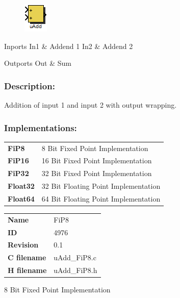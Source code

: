 \label{block:uAdd}
\begin{figure}[H]\includegraphics{uAdd}\end{figure} 

\begin{XtoCtabular}{Inports}
In1 & Addend 1\tabularnewline
\hline
In2 & Addend 2\tabularnewline
\hline
\end{XtoCtabular}


\begin{XtoCtabular}{Outports}
Out & Sum\tabularnewline
\hline
\end{XtoCtabular}

\subsubsection*{Description:}
Addition of input 1 and input 2 with output wrapping.


\subsubsection*{Implementations:}
\begin{tabular}{l l}
\textbf{FiP8} & 8 Bit Fixed Point Implementation\tabularnewline
\textbf{FiP16} & 16 Bit Fixed Point Implementation\tabularnewline
\textbf{FiP32} & 32 Bit Fixed Point Implementation\tabularnewline
\textbf{Float32} & 32 Bit Floating Point Implementation\tabularnewline
\textbf{Float64} & 64 Bit Floating Point Implementation\tabularnewline
\end{tabular}

\nopagebreak[0]
\begin{tabular}{l l}
\textbf{Name} & FiP8 \tabularnewline
\textbf{ID} & 4976 \tabularnewline
\textbf{Revision} & 0.1 \tabularnewline
\textbf{C filename} & uAdd\_FiP8.c \tabularnewline
\textbf{H filename} & uAdd\_FiP8.h \tabularnewline
\end{tabular}
\vspace{1ex}

8 Bit Fixed Point Implementation

